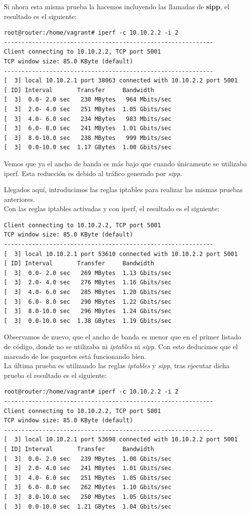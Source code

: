 \documentclass[11pt]{article}
\begin{document}
Si ahora esta misma prueba la hacemos incluyendo las llamadas de \textbf{sipp}, el resultado es el siguiente:

\begin{lstlisting}[style=C,numbers=none]
root@router:/home/vagrant# iperf -c 10.10.2.2 -i 2
------------------------------------------------------------
Client connecting to 10.10.2.2, TCP port 5001
TCP window size: 85.0 KByte (default)
------------------------------------------------------------
[  3] local 10.10.2.1 port 38063 connected with 10.10.2.2 port 5001
[ ID] Interval       Transfer     Bandwidth
[  3]  0.0- 2.0 sec   230 MBytes   964 Mbits/sec
[  3]  2.0- 4.0 sec   251 MBytes  1.05 Gbits/sec
[  3]  4.0- 6.0 sec   234 MBytes   983 Mbits/sec
[  3]  6.0- 8.0 sec   241 MBytes  1.01 Gbits/sec
[  3]  8.0-10.0 sec   238 MBytes   999 Mbits/sec
[  3]  0.0-10.0 sec  1.17 GBytes  1.00 Gbits/sec
\end{lstlisting}

Vemos que ya el ancho de banda es más bajo que cuando únicamente se utilizaba iperf. Esta reducción es debido al tráfico generado por \textit{sipp}.

Llegados aquí, introducimos las reglas iptables para realizar las mismas pruebas anteriores.\\
Con las reglas iptables activadas y con iperf, el resultado es el siguiente:
\begin{lstlisting}[style=C,numbers=none]
Client connecting to 10.10.2.2, TCP port 5001
TCP window size: 85.0 KByte (default)
------------------------------------------------------------
[  3] local 10.10.2.1 port 53610 connected with 10.10.2.2 port 5001
[ ID] Interval       Transfer     Bandwidth
[  3]  0.0- 2.0 sec   269 MBytes  1.13 Gbits/sec
[  3]  2.0- 4.0 sec   276 MBytes  1.16 Gbits/sec
[  3]  4.0- 6.0 sec   285 MBytes  1.20 Gbits/sec
[  3]  6.0- 8.0 sec   290 MBytes  1.22 Gbits/sec
[  3]  8.0-10.0 sec   296 MBytes  1.24 Gbits/sec
[  3]  0.0-10.0 sec  1.38 GBytes  1.19 Gbits/sec
\end{lstlisting}
Observamos de nuevo, que el ancho de banda es menor que en el primer listado de código, donde no se utilizaba ni \textit{iptables} ni \textit{sipp}. Con esto deducimos que el marcado de los paquetes está funcionando bien. \\

La última prueba es utilizando las reglas \textit{iptables} y \textit{sipp}, tras ejecutar dicha prueba el resultado es el siguiente:
\begin{lstlisting}[style=C,numbers=none]
root@router:/home/vagrant# iperf -c 10.10.2.2 -i 2
------------------------------------------------------------
Client connecting to 10.10.2.2, TCP port 5001
TCP window size: 85.0 KByte (default)
------------------------------------------------------------
[  3] local 10.10.2.1 port 53698 connected with 10.10.2.2 port 5001
[ ID] Interval       Transfer     Bandwidth
[  3]  0.0- 2.0 sec   239 MBytes  1.00 Gbits/sec
[  3]  2.0- 4.0 sec   241 MBytes  1.01 Gbits/sec
[  3]  4.0- 6.0 sec   251 MBytes  1.05 Gbits/sec
[  3]  6.0- 8.0 sec   262 MBytes  1.10 Gbits/sec
[  3]  8.0-10.0 sec   250 MBytes  1.05 Gbits/sec
[  3]  0.0-10.0 sec  1.21 GBytes  1.04 Gbits/sec
\end{lstlisting}
\end{document}
